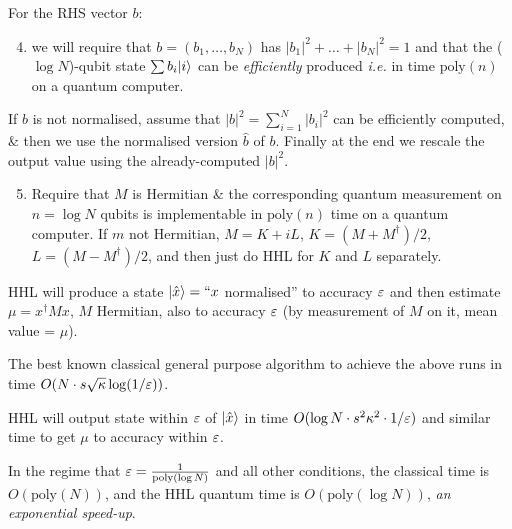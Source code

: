 \documentclass[]{article}
\renewcommand{\it}[1]{\textit{#1}}
\newcommand{\poly}{\textrm{poly}}
\begin{document}
For the RHS vector $b$:


\begin{enumerate}
	\setcounter{enumi}{3}
	\item we will require that $b = (b_1,\dots,b_N)$ has $|b_1|^2 + \dots + |b_N|^2 = 1$ and that the ($\log N$)-qubit state $\sum b_i\lvert i\rangle$ can be \it{efficiently} produced \it{i.e.} in time $\poly(n)$ on a quantum computer.
\end{enumerate}

\begin{remark*}
	If $b$ is not normalised, assume that $|b|^2 = \sum_{i=1}^{N}|b_i|^2$ can be efficiently computed, \& then we use the normalised version $\hat{b}$ of $b$. Finally at the end we rescale the output value using the already-computed $|b|^2$.
\end{remark*}

\begin{enumerate}
	\setcounter{enumi}{4}
	\item Require that $M$ is Hermitian \& the corresponding quantum measurement on $n = \log N$ qubits is implementable in $\poly(n)$ time on a quantum computer. If $m$ not Hermitian, $M = K + iL$, $K = (M+M^\dagger)/2$, $L = (M-M^\dagger)/2$, and then just do HHL for $K$ and $L$ separately.
\end{enumerate}


HHL will produce a state $\lvert\hat{x}\rangle = ``x$ normalised'' to accuracy $\varepsilon$ and then estimate $\mu = x^\dagger M x$, $M$ Hermitian, also to accuracy $\varepsilon$ (by measurement of $M$ on it, mean value = $\mu$).

The best known classical general purpose algorithm to achieve the above runs in time $O(N\cdot s\sqrt{\kappa} \log(1/\varepsilon))$.

HHL will output state within $\varepsilon$ of $\lvert\hat{x}\rangle$ in time $O(\log N \cdot s^2 \kappa^2 \cdot 1/\varepsilon)$ and similar time to get $\mu$ to accuracy within $\varepsilon$.

In the regime that $\eps = \frac{1}{\poly(\log N)}$ and all other conditions, the classical time is $O(\poly(N))$, and the HHL quantum time is $O(\poly(\log N))$, \it{an exponential speed-up}.
\end{document}
